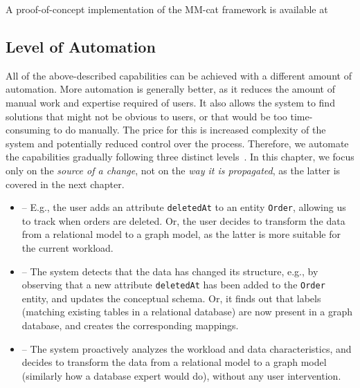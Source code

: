 A proof-of-concept implementation of the MM-cat framework is available at
\\



\subsection{Level of Automation}
\label{sec:vision_automation}

All of the above-described capabilities can be achieved with a different amount of automation. More automation is generally better, as it reduces the amount of manual work and expertise required of users. It also allows the system to find solutions that might not be obvious to users, or that would be too time-consuming to do manually. The price for this is increased complexity of the system and potentially reduced control over the process. Therefore, we automate the capabilities gradually following three distinct levels~\citep{ideas2022vision}. In this chapter, we focus only on the \emph{source of a change}, not on the \emph{way it is propagated}, as the latter is covered in the next chapter.

\begin{itemize}
    \item {} -- E.g., the user adds an attribute \texttt{deletedAt} to an entity \texttt{Order}, allowing us to track when orders are deleted. Or, the user decides to transform the data from a relational model to a graph model, as the latter is more suitable for the current workload.
    \item {} -- The system detects that the data has changed its structure, e.g., by observing that a new attribute \texttt{deletedAt} has been added to the \texttt{Order} entity, and updates the conceptual schema. Or, it finds out that labels (matching existing tables in a relational database) are now present in a graph database, and creates the corresponding mappings.
    \item {} -- The system proactively analyzes the workload and data characteristics, and decides to transform the data from a relational model to a graph model (similarly how a database expert would do), without any user intervention.
\end{itemize}

